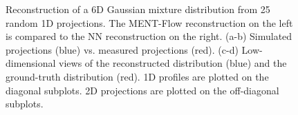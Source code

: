 \documentclass[%
    reprint,
    twocolumn,
    nofootinbib,
    amsmath,
    amssymb,
    aps,
    prstab,
]{revtex4-2}
\begin{document}
\begin{figure}
{        \label{fig:rec_6d_1d_gmm_25meas-c}%
    }%
    \hfill
    \caption{Reconstruction of a 6D Gaussian mixture distribution from 25 random 1D projections. The MENT-Flow reconstruction on the left is compared to the NN reconstruction on the right. (a-b) Simulated projections (blue) vs. measured projections (red). (c-d) Low-dimensional views of the reconstructed distribution (blue) and the ground-truth distribution (red). 1D profiles are plotted on the diagonal subplots. 2D projections are plotted on the off-diagonal subplots.}
    \label{fig:rec_6d_1d_gmm_25meas}
\end{figure}
%
%
\end{document}
